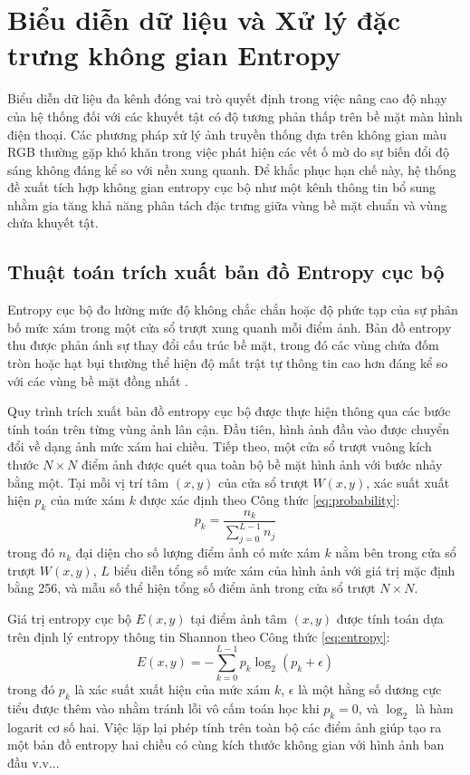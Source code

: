 \section{Biểu diễn dữ liệu và Xử lý đặc trưng không gian Entropy}
\label{sec:bieudien_dulieu}

Biểu diễn dữ liệu đa kênh đóng vai trò quyết định trong việc nâng cao độ nhạy của hệ thống đối với các khuyết tật có độ tương phản thấp trên bề mặt màn hình điện thoại. Các phương pháp xử lý ảnh truyền thống dựa trên không gian màu RGB thường gặp khó khăn trong việc phát hiện các vết ố mờ do sự biến đổi độ sáng không đáng kể so với nền xung quanh. Để khắc phục hạn chế này, hệ thống đề xuất tích hợp không gian entropy cục bộ như một kênh thông tin bổ sung nhằm gia tăng khả năng phân tách đặc trưng giữa vùng bề mặt chuẩn và vùng chứa khuyết tật.

\subsection{Thuật toán trích xuất bản đồ Entropy cục bộ}
\label{subsec:entropy_extraction}

Entropy cục bộ đo lường mức độ không chắc chắn hoặc độ phức tạp của sự phân bố mức xám trong một cửa sổ trượt xung quanh mỗi điểm ảnh. Bản đồ entropy thu được phản ánh sự thay đổi cấu trúc bề mặt, trong đó các vùng chứa đốm tròn hoặc hạt bụi thường thể hiện độ mất trật tự thông tin cao hơn đáng kể so với các vùng bề mặt đồng nhất \cite{shannon1948mathematical}.

Quy trình trích xuất bản đồ entropy cục bộ được thực hiện thông qua các bước tính toán trên từng vùng ảnh lân cận. Đầu tiên, hình ảnh đầu vào được chuyển đổi về dạng ảnh mức xám hai chiều. Tiếp theo, một cửa sổ trượt vuông kích thước $N \times N$ điểm ảnh được quét qua toàn bộ bề mặt hình ảnh với bước nhảy bằng một. Tại mỗi vị trí tâm $(x,y)$ của cửa sổ trượt $W(x,y)$, xác suất xuất hiện $p_k$ của mức xám $k$ được xác định theo Công thức \ref{eq:probability}:
\begin{equation}
\label{eq:probability}
p_k = \frac{n_k}{\sum_{j=0}^{L-1} n_j}
\end{equation}
trong đó $n_k$ đại diện cho số lượng điểm ảnh có mức xám $k$ nằm bên trong cửa sổ trượt $W(x,y)$, $L$ biểu diễn tổng số mức xám của hình ảnh với giá trị mặc định bằng 256, và mẫu số thể hiện tổng số điểm ảnh trong cửa sổ trượt $N \times N$.

Giá trị entropy cục bộ $E(x,y)$ tại điểm ảnh tâm $(x,y)$ được tính toán dựa trên định lý entropy thông tin Shannon theo Công thức \ref{eq:entropy}:
\begin{equation}
\label{eq:entropy}
E(x,y) = -\sum_{k=0}^{L-1} p_k \log_2 (p_k + \epsilon)
\end{equation}
trong đó $p_k$ là xác suất xuất hiện của mức xám $k$, $\epsilon$ là một hằng số dương cực tiểu được thêm vào nhằm tránh lỗi vô cấm toán học khi $p_k = 0$, và $\log_2$ là hàm logarit cơ số hai. Việc lặp lại phép tính trên toàn bộ các điểm ảnh giúp tạo ra một bản đồ entropy hai chiều có cùng kích thước không gian với hình ảnh ban đầu v.v...

